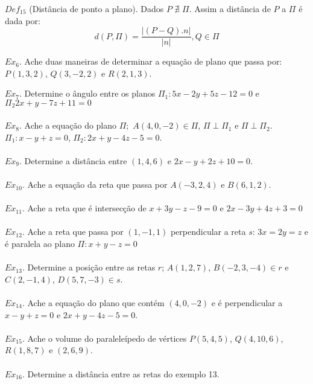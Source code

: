 \documentclass{article}
\begin{document}
\begin{enumerate}
        $Def_{15}$ (Distância de ponto a plano). Dados $P$ $\nexists$ $\Pi$. Assim a distância de $P$ a $\Pi$ é dada por: $$ d(P, \Pi) = \frac{|(P - Q) . n|}{|n|}, Q \in \Pi $$
        
        $Ex_6$. Ache duas maneiras de determinar a equação de plano que passa por: $P(1,3,2)$, $Q(3,-2,2)$ e $R(2,1,3)$.\\ \vspace{1pt}
        
        $Ex_7$. Determine o ângulo entre os planos $\Pi _1: 5x -2y + 5z -12 = 0$ e $\Pi _2 2x + y -7z + 11 = 0$\\
        \\
        $Ex_8$. Ache a equação do plano $\Pi;$ $A(4,0,-2) \in \Pi$, $\Pi \perp \Pi _1$ e $\Pi \perp \Pi _2$. $\Pi _1: x - y + z = 0$, $\Pi _2: 2x + y - 4z - 5 = 0$.\\
        \\
        $Ex_9$. Determine a distância entre $(1,4,6)$ e $2x - y + 2z + 10 = 0$.\\
        \\
        $Ex_{10}$. Ache a equação da reta que passa por $A(-3,2,4)$ e $B(6,1,2)$.\\
        \\
        $Ex_{11}$. Ache a reta que é intersecção de $x + 3y - z - 9 = 0$ e $2x - 3y + 4z + 3 = 0$\\
        \\
        $Ex_{12}$. Ache a reta que passa por $(1,-1,1)$ perpendicular a reta $s$: $3x = 2y = z$ e é paralela ao plano $\Pi: x + y - z = 0$\\
        \\
        $Ex_{13}$. Determine a posição entre as retas $r$; $A(1,2,7)$, $B(-2,3,-4) \in  r$ e $C(2,-1,4)$, $D(5,7,-3) \in s$.\\
        \\
        $Ex_{14}$. Ache a equação do plano que contém $(4,0,-2)$ e é perpendicular a $x - y + z = 0$ e $2x + y - 4z - 5 = 0$.\\
        \\
        $Ex_{15}$. Ache o volume do paraleleípedo de vértices $P(5,4,5)$, $Q(4,10,6)$, $R(1,8,7)$ e $(2,6,9)$.\\
        \\
        $Ex_{16}$. Determine a distância entre as retas do exemplo 13.
        
                    
\end{enumerate}
\end{document}
